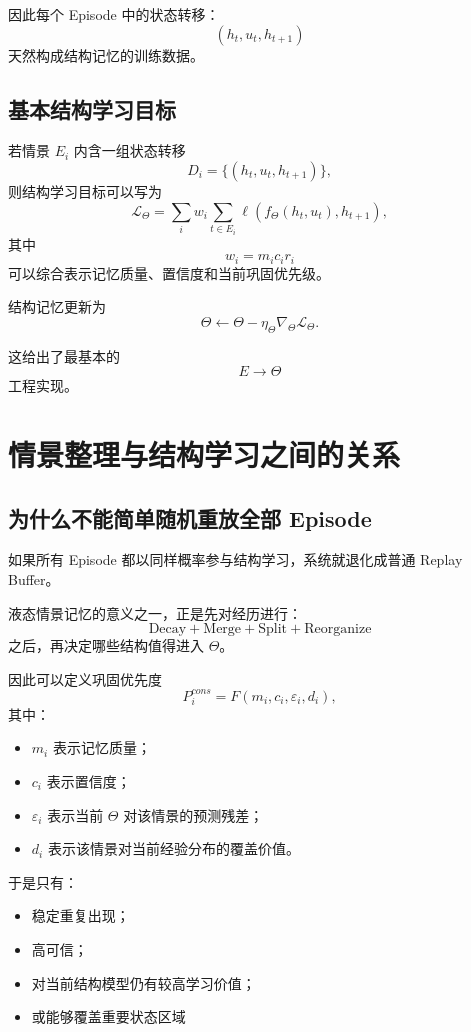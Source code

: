 因此每个 Episode 中的状态转移：
\[
(h_t,u_t,h_{t+1})
\]
天然构成结构记忆的训练数据。

\subsection{基本结构学习目标}

若情景 $E_i$ 内含一组状态转移
\[
D_i
=
\{
(h_t,u_t,h_{t+1})
\},
\]
则结构学习目标可以写为
\[
\boxed{
\mathcal{L}_\Theta
=
\sum_i
w_i
\sum_{t\in E_i}
\ell
\left(
f_\Theta(h_t,u_t),
h_{t+1}
\right),
}
\]
其中
\[
w_i
=
m_i
c_i
r_i
\]
可以综合表示记忆质量、置信度和当前巩固优先级。

结构记忆更新为
\[
\boxed{
\Theta
\leftarrow
\Theta
-
\eta_\Theta
\nabla_\Theta
\mathcal{L}_\Theta.
}
\]

这给出了最基本的
\[
E\rightarrow\Theta
\]
工程实现。

\section{情景整理与结构学习之间的关系}

\subsection{为什么不能简单随机重放全部 Episode}

如果所有 Episode 都以同样概率参与结构学习，系统就退化成普通 Replay Buffer。

液态情景记忆的意义之一，正是先对经历进行：
\[
\boxed{
\mathrm{Decay}
+
\mathrm{Merge}
+
\mathrm{Split}
+
\mathrm{Reorganize}
}
\]
之后，再决定哪些结构值得进入 $\Theta$。

因此可以定义巩固优先度
\[
\boxed{
P_i^{cons}
=
F
\left(
m_i,
c_i,
\varepsilon_i,
d_i
\right),
}
\]
其中：

\begin{itemize}
    \item $m_i$ 表示记忆质量；
    \item $c_i$ 表示置信度；
    \item $\varepsilon_i$ 表示当前 $\Theta$ 对该情景的预测残差；
    \item $d_i$ 表示该情景对当前经验分布的覆盖价值。
\end{itemize}

于是只有：

\begin{itemize}
    \item 稳定重复出现；
    \item 高可信；
    \item 对当前结构模型仍有较高学习价值；
    \item 或能够覆盖重要状态区域
\end{itemize}

